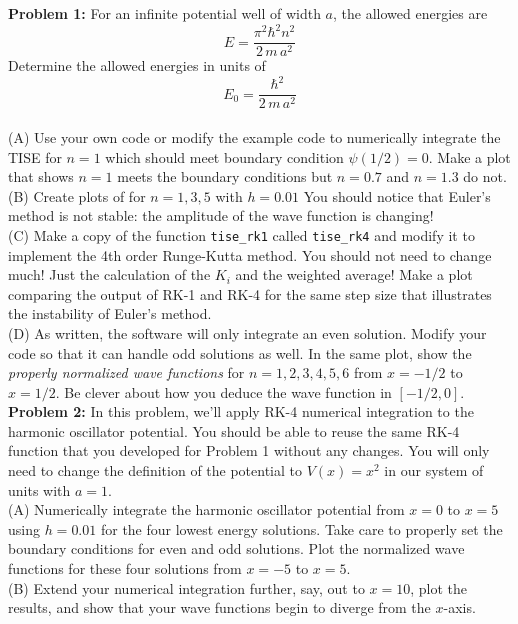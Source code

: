 \documentclass[12pt]{book}
\begin{document}
\noindent
{\bf Problem 1:}  For an infinite potential well of width $a$, the allowed energies are
$$E = \frac{\pi^2 \hbar^2 n^2}{2 \, m \, a^2}$$  
Determine the allowed energies in units of 
$$E_0 = \frac{\hbar^2}{2 \, m \, a^2}$$\\[3pt]
\noindent
(A) Use your own code or modify the example code to numerically integrate the TISE for $n=1$ which should meet boundary condition $\psi(1/2)=0$.  Make a plot that shows $n=1$ meets the boundary conditions but $n=0.7$ and $n=1.3$ do not.\\[5pt]
(B) Create plots of for $n=1,3,5$ with $h=0.01$  You should notice that Euler's method 
is not stable:  the amplitude of the wave function is changing!\\[5pt]
(C) Make a copy of the function {\tt tise\_rk1} called {\tt tise\_rk4} and modify it to implement the 4th order Runge-Kutta method.  You should not need to change much!  Just the calculation of the $K_i$ and the weighted average!  Make a plot comparing the output of RK-1 and RK-4 for the same step size that illustrates the instability of Euler's method. \\[5pt]
(D) As written, the software will only integrate an even solution.  Modify your code so that it can handle odd solutions as well.  In the same plot, show the {\em properly normalized wave functions} for $n=1,2,3,4,5,6$ from $x=-1/2$ to $x=1/2$.  Be clever about how you deduce the wave function in $[-1/2,0]$.\\[5pt]

\noindent
{\bf Problem 2:}  In this problem, we'll apply RK-4 numerical integration to the harmonic oscillator potential.  You should be able to reuse the same RK-4 function that you developed for Problem 1 without any changes.  You will only need to change the definition of the potential to $V(x) = x^2$ in our system of units with $a=1$.\\[5pt]

\noindent
(A) Numerically integrate the harmonic oscillator potential from $x=0$ to $x=5$ using $h=0.01$ for the four lowest energy solutions.  Take care to properly set the boundary conditions for even and odd solutions.  Plot the normalized wave functions for these four solutions from $x=-5$ to $x=5$.\\[5pt]

\noindent
(B) Extend your numerical integration further, say, out to $x=10$, plot the results, and show that your wave functions begin to diverge from the $x$-axis.\\[5pt]
\end{document}

